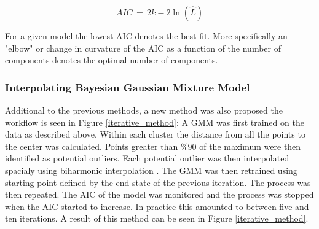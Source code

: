 \documentclass[a4paper,11pt]{article}
\begin{document}
\begin{equation}
    AIC \, = \, 2k - 2\ln(\hat L)
\end{equation}

For a given model the lowest AIC denotes the best fit. More specifically an "elbow" or change in curvature of the AIC as a function of the number of components denotes the optimal number of components.

\subsubsection{Interpolating Bayesian Gaussian Mixture Model}

Additional to the previous methods, a new method was also proposed the workflow is seen in Figure \ref{iterative_method}: A GMM was first trained on the data as described above. Within each cluster the distance from all the points to the center was calculated. Points greater than \%90 of the maximum were then identified as potential outliers. Each potential outlier was then interpolated spacialy using biharmonic interpolation \cite{damelin}. The GMM was then retrained using starting point defined by the end state of the previous iteration. The process was then repeated. The AIC of the model was monitored and the process was stopped when the AIC started to increase. In practice this amounted to between five and ten iterations. A result of this method can be seen in Figure \ref{iterative_method}.
\end{document}
